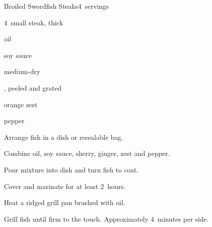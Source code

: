 \begin{recipe}{Broiled Swordfish Steaks}{}{4~servings}

\begin{ingredients}
\item 4~small  steak, \inch{\threequarter} thick
\item \C{\half} oil
\item {} soy sauce
\item {} medium-dry 
\item \tp{1\half} , peeled and grated
\item {} orange zest
\item pepper
\end{ingredients}

\begin{directions}
\item Arrange fish in a dish or resealable bag.
\item Combine oil, soy sauce, sherry, ginger, zest and pepper.
\item Pour mixture into dish and turn fish to coat.
\item Cover and marinate for at least 2~hours.
\item Heat a ridged grill pan brushed with oil.
\item Grill fish until firm to the touch. Approximately 4~minutes per side.
\end{directions}

\end{recipe}
